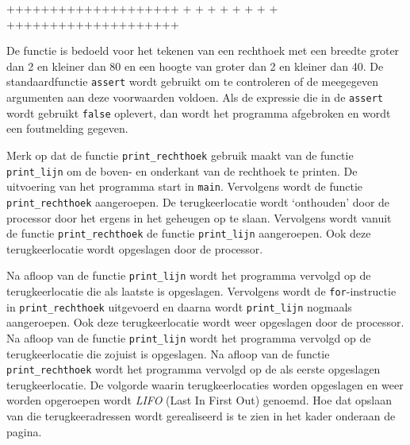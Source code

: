 \begin{dosbox}[title=Uitvoer van het programma in listing~\ref{cod:print_rechthoek}.,label=fig:print_rechthoek]
++++++++++++++++++++
+                  +
+                  +
+                  +
+                  +
++++++++++++++++++++
\end{dosbox}


De functie is bedoeld voor het tekenen van een rechthoek met een breedte groter dan 2 en kleiner dan 80 en een hoogte van groter dan 2 en kleiner dan 40. 
De standaardfunctie \texttt{assert} wordt gebruikt om te controleren of de meegegeven argumenten aan deze voorwaarden voldoen.
Als de expressie die in de \texttt{assert} wordt gebruikt \texttt{false} oplevert, dan wordt het programma afgebroken en wordt een foutmelding gegeven.

Merk op dat de functie \texttt{print\_rechthoek} gebruik maakt van de functie \texttt{print\_lijn} om de boven- en onderkant van de rechthoek te printen.
De uitvoering van het programma start in \texttt{main}.
Vervolgens wordt de functie \texttt{print\_rechthoek} aangeroepen.
De terugkeerlocatie wordt `onthouden' door de processor door het ergens in het geheugen op te slaan.
Vervolgens wordt vanuit de functie \texttt{print\_rechthoek} de functie \texttt{print\_lijn} aangeroepen. 
Ook deze terugkeerlocatie wordt opgeslagen door de processor.

Na afloop van de functie \texttt{print\_lijn} wordt het programma vervolgd op de terugkeerlocatie die als laatste is opgeslagen.
Vervolgens wordt de \texttt{for}-instructie in \texttt{print\_rechthoek} uitgevoerd en daarna wordt \texttt{print\_lijn} nogmaals aangeroepen.
Ook deze terugkeerlocatie wordt weer opgeslagen door de processor.
Na afloop van de functie \texttt{print\_lijn} wordt het programma vervolgd op de terugkeerlocatie die zojuist is opgeslagen.
Na afloop van de functie \texttt{print\_rechthoek} wordt het programma vervolgd op de als eerste opgeslagen terugkeerlocatie.
De volgorde waarin terugkeerlocaties worden opgeslagen en weer worden opgeroepen wordt \textsl{LIFO} (Last In First Out) genoemd.
Hoe dat opslaan van die terugkeeradressen wordt gerealiseerd is te zien in het kader onderaan de pagina.

